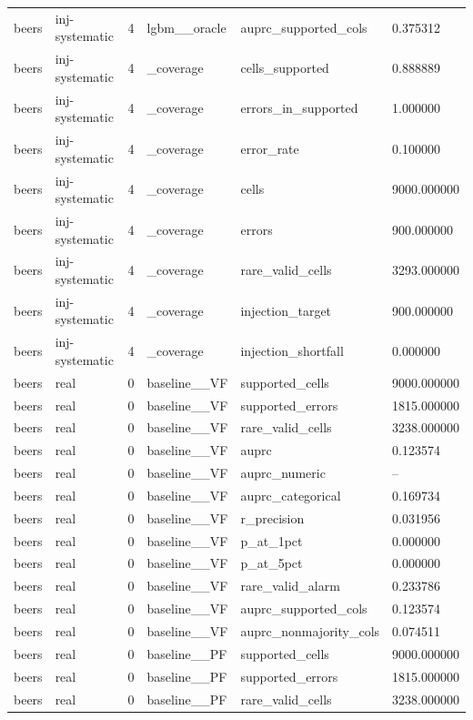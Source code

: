 \begin{tabular}{llllll}
beers & inj-systematic & 4 & lgbm\_\_oracle & auprc\_supported\_cols & 0.375312 \\
beers & inj-systematic & 4 & \_coverage & cells\_supported & 0.888889 \\
beers & inj-systematic & 4 & \_coverage & errors\_in\_supported & 1.000000 \\
beers & inj-systematic & 4 & \_coverage & error\_rate & 0.100000 \\
beers & inj-systematic & 4 & \_coverage & cells & 9000.000000 \\
beers & inj-systematic & 4 & \_coverage & errors & 900.000000 \\
beers & inj-systematic & 4 & \_coverage & rare\_valid\_cells & 3293.000000 \\
beers & inj-systematic & 4 & \_coverage & injection\_target & 900.000000 \\
beers & inj-systematic & 4 & \_coverage & injection\_shortfall & 0.000000 \\
beers & real & 0 & baseline\_\_VF & supported\_cells & 9000.000000 \\
beers & real & 0 & baseline\_\_VF & supported\_errors & 1815.000000 \\
beers & real & 0 & baseline\_\_VF & rare\_valid\_cells & 3238.000000 \\
beers & real & 0 & baseline\_\_VF & auprc & 0.123574 \\
beers & real & 0 & baseline\_\_VF & auprc\_numeric & -- \\
beers & real & 0 & baseline\_\_VF & auprc\_categorical & 0.169734 \\
beers & real & 0 & baseline\_\_VF & r\_precision & 0.031956 \\
beers & real & 0 & baseline\_\_VF & p\_at\_1pct & 0.000000 \\
beers & real & 0 & baseline\_\_VF & p\_at\_5pct & 0.000000 \\
beers & real & 0 & baseline\_\_VF & rare\_valid\_alarm & 0.233786 \\
beers & real & 0 & baseline\_\_VF & auprc\_supported\_cols & 0.123574 \\
beers & real & 0 & baseline\_\_VF & auprc\_nonmajority\_cols & 0.074511 \\
beers & real & 0 & baseline\_\_PF & supported\_cells & 9000.000000 \\
beers & real & 0 & baseline\_\_PF & supported\_errors & 1815.000000 \\
beers & real & 0 & baseline\_\_PF & rare\_valid\_cells & 3238.000000 \\

\end{tabular}
